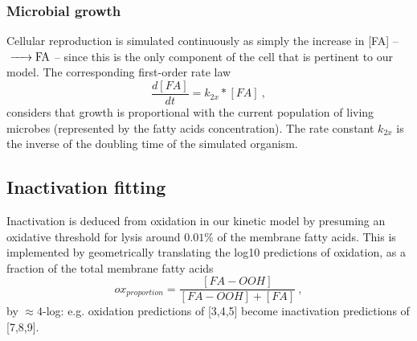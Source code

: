 \subsubsection{Microbial growth}
Cellular reproduction is simulated continuously as simply the increase in [FA] -- $\ce{->FA}$ -- since this is the only component of the cell that is pertinent to our model. The corresponding first-order rate law
\begin{equation}
    \frac{d[FA]}{dt} = k_{2x} * [FA]~,
\end{equation}
considers that growth is proportional with the current population of living microbes (represented by the fatty acids concentration). The rate constant $k_{2x}$ is the inverse of the doubling time of the simulated organism. 

\subsection{Inactivation fitting}

Inactivation is deduced from oxidation in our kinetic model by presuming an oxidative threshold for lysis around $0.01\%$ of the membrane fatty acids. This is implemented by geometrically translating the log10 predictions of oxidation, as a fraction of the total membrane fatty acids
\begin{equation} \label{oxidation_proportion}
    ox_{proportion} = \frac{[FA-OOH]}{[FA-OOH]+[FA]}~,
\end{equation}
by $\approx 4$-log: e.g. oxidation predictions of [3,4,5] become inactivation predictions of [7,8,9]. 


